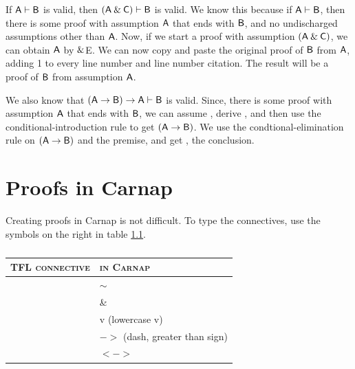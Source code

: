 \problempart
If $\mathsf{A} \vdash \mathsf{B}$ is valid, then $(\mathsf{A} \mathbin{\&} \mathsf{C})\vdash \mathsf{B}$ is valid. We know this because if $\mathsf{A} \vdash \mathsf{B}$, then there is some proof with assumption $\mathsf{A}$ that ends with $\mathsf{B}$, and no undischarged assumptions other than $\mathsf{A}$. Now, if we start a proof with assumption $(\mathsf{A} \mathbin{\&} \mathsf{C})$, we can obtain $\mathsf{A}$ by $\mathbin{\&}$E. We can now copy and paste the original proof of $\mathsf{B}$ from $\mathsf{A}$, adding 1 to every line number and line number citation. The result will be a proof of $\mathsf{B}$ from assumption $\mathsf{A}$.

We also know that $(\mathsf{A} \rightarrow \mathsf{B}) \rightarrow \mathsf{A} \vdash \mathsf{B}$ is valid. Since, there is some proof with assumption $\mathsf{A}$ that ends with $\mathsf{B}$, we can assume , derive , and then use the conditional-introduction rule to get $(\mathsf{A} \rightarrow \mathsf{B})$. We use the condtional-elimination rule on $(\mathsf{A} \rightarrow \mathsf{B})$ and the premise, and get , the conclusion.









\chapter{Proofs in Carnap}\label{s:Carnap-proofs}

Creating proofs in Carnap is not difficult. To type the connectives, use the symbols on the right in table \ref{symbols-Carnap}. 

\begin{table}\centering\sffamily\footnotesize
{}
\begin{tabular}{@{}l l@{}}\toprule
\textsc{TFL connective} & \textsc{in Carnap} \\\midrule
	\enot & $ \sim$\\
	\eand & \&\\
	\eor & v (lowercase v)\\
	\eif & $-$$>$ (dash, greater than sign)\\
	\eiff & $<$$-$$>$\\
\bottomrule
\end{tabular}
\caption{}\label{symbols-Carnap}
\end{table}


